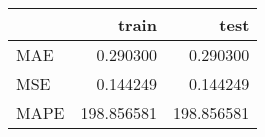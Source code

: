 \begin{tabular}{lrr}
\toprule
{} &       train &        test \\
\midrule
MAE  &    0.290300 &    0.290300 \\
MSE  &    0.144249 &    0.144249 \\
MAPE &  198.856581 &  198.856581 \\
\bottomrule
\end{tabular}
